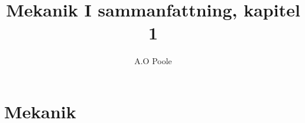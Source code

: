 \documentclass[a4paper,12pt]{article}
\title{Mekanik I sammanfattning, kapitel 1}
\author{A.O Poole}
\begin{document}
\section{Mekanik}
\end{document}
